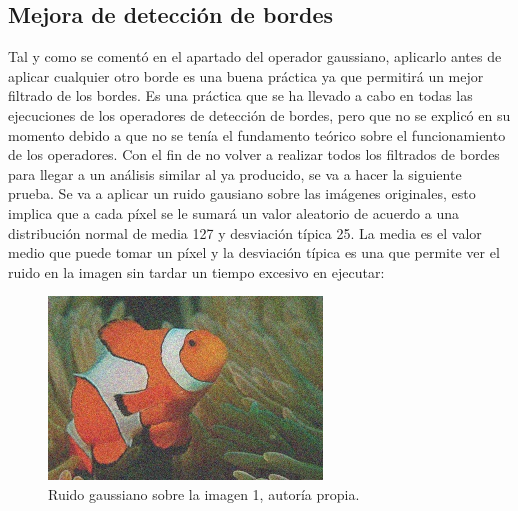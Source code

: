\documentclass[a4paper,12pt]{article}
\begin{document}
{\vspace{0.5cm}

\subsection{Mejora de detección de bordes}

\vspace{0.5cm}

Tal y como se comentó en el apartado del operador gaussiano, aplicarlo antes de aplicar cualquier otro borde es una buena práctica ya que 
permitirá un mejor filtrado de los bordes. Es una práctica que se ha llevado a cabo en todas las ejecuciones de los operadores de detección de bordes,
pero que no se explicó en su momento debido a que no se tenía el fundamento teórico sobre el funcionamiento de los operadores. Con el fin de no volver a
realizar todos los filtrados de bordes para llegar a un análisis similar al ya producido, se va a hacer la siguiente prueba. Se va a aplicar un ruido
gausiano sobre las imágenes originales, esto implica que a cada píxel se le sumará un valor aleatorio de acuerdo a una distribución normal de media 127 
y desviación típica 25. La media es el valor medio que puede tomar un píxel y la desviación típica es una que permite ver el ruido en la imagen sin tardar
un tiempo excesivo en ejecutar:

\vspace{0.5cm}

\begin{figure}[H]
  \centering
  \begin{minipage}[t]{0.3\textwidth}
      \centering
      \includegraphics[width=\textwidth]{noisy_data/noisy_0.jpg} 
      \caption{Ruido gaussiano sobre la imagen 1, autoría propia.}
      \label{fig:gaussian_noise}
  \end{minipage}
\end{figure}

}
\end{document}
